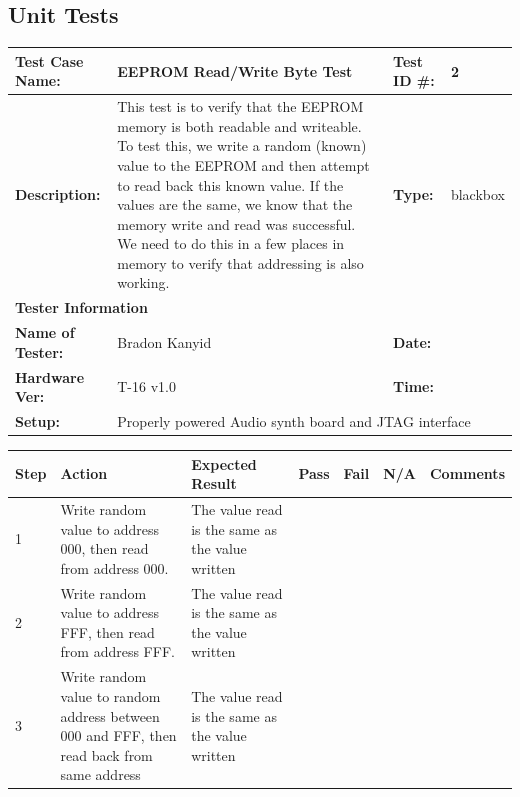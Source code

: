 \documentclass{article}
\begin{document}
\subsection{Unit Tests}
\begin{tabular}{|p{1.3in}|p{3in}|p{.8in}|p{.5in}|}
  \hline
  \textbf{Test Case Name:} & EEPROM Read/Write Byte Test & \textbf{Test ID \#:} & 2\\
  \hline
  \textbf{Description:} &
  This test is to verify that the EEPROM memory is both readable and writeable. To test this, we write a random (known) value to the EEPROM and then attempt to read back this known value. If the values are the same, we know that the memory write and read was successful. We need to do this in a few places in memory to verify that addressing is also working. 
  & \textbf{Type:} & blackbox \\
  \hline
  \multicolumn{4}{|l|}{\textbf{Tester Information}} \\ 
  \hline
  \textbf{Name of Tester:} & Bradon Kanyid & \textbf{Date:} & \\
  \hline
  \textbf{Hardware Ver:} & T-16 v1.0 & \textbf{Time:} & \\
  \hline
  \textbf{Setup:} & \multicolumn{3}{l|}{Properly powered Audio synth board and JTAG interface} \\
  \hline
\end{tabular}
\begin{tabular}{|p{.3in}|p{1in}|p{1.3in}|p{.25in}|p{.25in}|p{.3in}|p{1.7in}|}
  \hline
  \textbf{Step} & \textbf{Action} & \textbf{Expected Result} & \textbf{Pass} & \textbf{Fail} & \textbf{N/A} & \textbf{Comments} \\
  \hline
  1 & Write random value to address 000, then read from address 000. & The value read is the same as the value written & & & &\\
  \hline
  2 & Write random value to address FFF, then read from address FFF. & The value read is the same as the value written & & & &\\
  \hline
  3 & Write random value to random address between 000 and FFF, then read back from same address & The value read is the same as the value written & & & &\\
  \hline
\end{tabular}
\newpage
\end{document}
